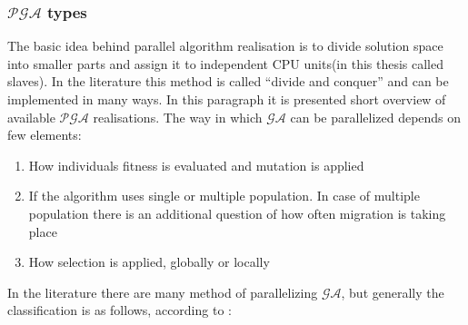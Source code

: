 \subsubsection{$\mathcal{PGA}$ types}
\label{cha:PgaTypes}
The basic idea behind parallel algorithm realisation is to divide solution space
into smaller parts and assign it to independent CPU units(in this thesis called
slaves). In the literature this method is called ``divide and conquer'' and can be implemented in many ways. In
this paragraph it is presented short overview of available $\mathcal{PGA}$
realisations. The way in which $\mathcal{GA}$ can be parallelized depends on few
elements:
\begin{enumerate}
	\item How individuals fitness is evaluated and mutation is applied 
	\item If the algorithm uses single or multiple population. In case of
		multiple population there is an additional question of how often migration
		is taking place
	\item How selection is applied, globally or locally
\end{enumerate}
In the literature there are many method of parallelizing $\mathcal{GA}$, but
generally the classification is as follows, according to \cite{bib10}:
